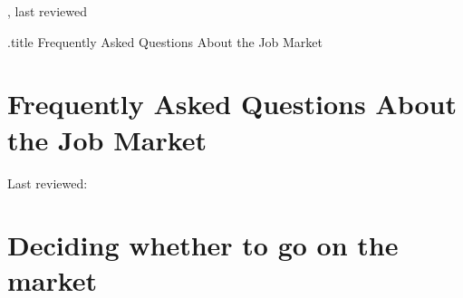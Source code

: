 \documentclass{\classes/econtex}
\begin{document}
\hfill{\tiny \jobname, last reviewed \lastreviewedFAQ} \vspace{.1in}

\begin{verbatimwrite}{\jobname.title}
  Frequently Asked Questions About the Job Market
\end{verbatimwrite}

\section*{\Large Frequently Asked Questions About the Job Market}\medskip\medskip

\centerline{\small Last reviewed: \lastreviewedFAQ}\medskip\medskip



\section*{Deciding whether to go on the market}
\end{document}
